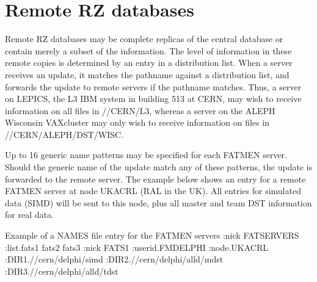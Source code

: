 \section{Remote RZ databases}
\par
{}
Remote RZ databases may be complete replicas of the central database
or contain merely a subset
of the information. The level of information
in these remote copies is determined by an entry in a distribution list.
When a server receives an update, it matches the pathname against
a distribution list, and forwards the update to remote servers if
the pathname matches. Thus, a server on LEPICS, the L3 IBM system
in building 513 at CERN, may wish to receive information on all
files in //CERN/L3, whereas a server on the ALEPH Wisconsin VAXcluster
may only wish to receive information on files in //CERN/ALEPH/DST/WISC.
\par
Up to 16 generic name patterns may be specified for each FATMEN server.
Should the generic name of the update match any of these patterns,
the update is forwarded to the remote server.
The example below shows an entry for a remote FATMEN server at node
UKACRL (RAL in the UK). All entries for simulated data (SIMD) will
be sent to this node, plus all master and team DST information for
real data.
\label{GENFIL}
\begin{XMPt}{Example of a NAMES file entry for the FATMEN servers}
:nick FATSERVERS
              :list.fats1 fats2 fats3
:nick FATS1
:userid.FMDELPHI
:node.UKACRL
              :DIR1.//cern/delphi/simd
              :DIR2.//cern/delphi/alld/mdst
              :DIR3.//cern/delphi/alld/tdst
\end{XMPt}
